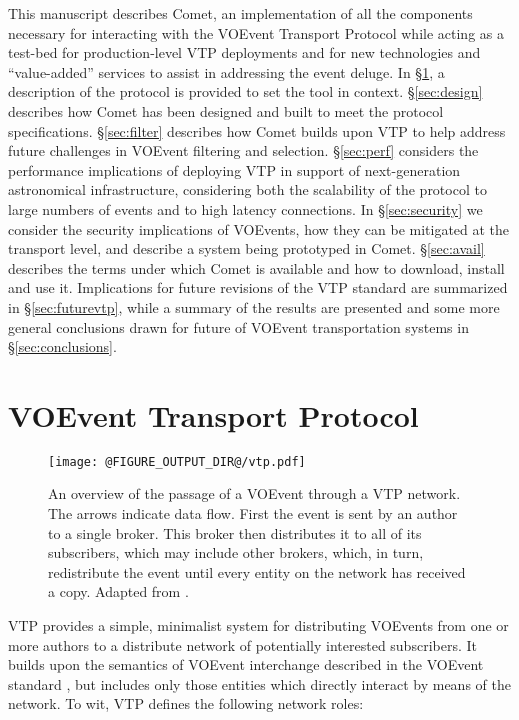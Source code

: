 \documentclass[5p,authoryear]{elsarticle}
\begin{document}
This manuscript describes Comet, an implementation of all the components
necessary for interacting with the VOEvent Transport Protocol while acting as
a test-bed for production-level VTP deployments and for new technologies and
``value-added'' services to assist in addressing the event deluge.  In
\S\ref{sec:vtp}, a description of the protocol is provided to set the tool in
context. \S\ref{sec:design} describes how Comet has been designed and built to
meet the protocol specifications. \S\ref{sec:filter} describes how Comet
builds upon VTP to help address future challenges in VOEvent filtering and
selection. \S\ref{sec:perf} considers the performance implications of
deploying VTP in support of next-generation astronomical infrastructure,
considering both the scalability of the protocol to large numbers of events
and to high latency connections. In \S\ref{sec:security} we consider the
security implications of VOEvents, how they can be mitigated at the transport
level, and describe a system being prototyped in Comet. \S\ref{sec:avail}
describes the terms under which Comet is available and how to download,
install and use it. Implications for future revisions of the VTP standard are
summarized in \S\ref{sec:futurevtp}, while a summary of the results are
presented and some more general conclusions drawn for future of VOEvent
transportation systems in \S\ref{sec:conclusions}.

\section{VOEvent Transport Protocol}
\label{sec:vtp}

\begin{figure*}
  \begin{center}
  \texttt{[image: @FIGURE\_OUTPUT\_DIR@/vtp.pdf]}
  \end{center}

  \caption{An overview of the passage of a VOEvent through a VTP network. The
  arrows indicate data flow. First the event is sent by an author to a single
  broker. This broker then distributes it to all of its subscribers, which may
  include other brokers, which, in turn, redistribute the event until every
  entity on the network has received a copy.  Adapted from
  \citet{Swinbank:2014}.}

  \label{fig:vtp}
\end{figure*}

VTP provides a simple, minimalist system for distributing VOEvents from one or
more authors to a distribute network of potentially interested subscribers. It
builds upon the semantics of VOEvent interchange described in the VOEvent
standard \citep{Seaman:2011}, but includes only those entities which directly
interact by means of the network. To wit, VTP defines the following network
roles:
\end{document}
